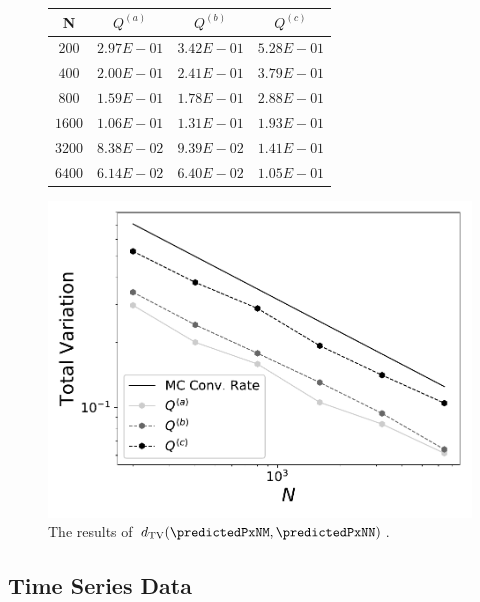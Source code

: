 \begin{frame}[t]
\small
\begin{figure}[h]
\begin{table}[H]
\begin{tabular}{ c | c | c | c }

N & $Q^{(a)}$ & $Q^{(b)}$ & $Q^{(c)}$\\ \hline \hline
$200$ & $2.97E-01$ & $3.42E-01$ & $5.28E-01$\\ \hline

$400$ & $2.00E-01$ & $2.41E-01$ & $3.79E-01$\\ \hline

$800$ & $1.59E-01$ & $1.78E-01$ & $2.88E-01$\\ \hline

$1600$ & $1.06E-01$ & $1.31E-01$ & $1.93E-01$\\ \hline

$3200$ & $8.38E-02$ & $9.39E-02$ & $1.41E-01$\\ \hline

$6400$ & $6.14E-02$ & $6.40E-02$ & $1.05E-01$\\ \hline

\end{tabular}
\end{table}

		\includegraphics[width=0.5\linewidth]{./images/Plot-reg_BigN_40000_reg_M_1_rand_I_100000}

\caption{The results of $d_\text{TV}(\predictedPxNM, \predictedPxNN)$.}
\label{fig:skew}
\end{figure}
\end{frame}

\subsection{Time Series Data}

